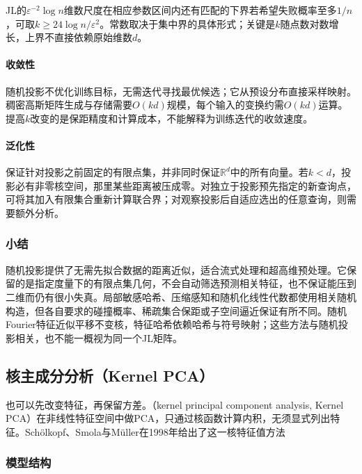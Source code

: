 JL的$\varepsilon^{-2}\log n$维数尺度在相应参数区间内还有匹配的下界若希望失败概率至多$1/n$，可取$k\geq24\log n/\varepsilon^2$。常数取决于集中界的具体形式；关键是$k$随点数对数增长，上界不直接依赖原始维数$d$。

\paragraph{收敛性}
随机投影不优化训练目标，无需迭代寻找最优候选；它从预设分布直接采样映射。稠密高斯矩阵生成与存储需要$O(kd)$规模，每个输入的变换约需$O(kd)$运算。提高$k$改变的是保距精度和计算成本，不能解释为训练迭代的收敛速度。

\paragraph{泛化性}

保证针对投影之前固定的有限点集，并非同时保证$\mathbb{R}^{d}$中的所有向量。若$k<d$，投影必有非零核空间，那里某些距离被压成零。对独立于投影预先指定的新查询点，可将其加入有限集合重新计算联合界；对观察投影后自适应选出的任意查询，则需要额外分析。

\subsubsection{小结}
\label{sec:dim-rp-summary}

随机投影提供了无需先拟合数据的距离近似，适合流式处理和超高维预处理。它保留的是指定度量下的有限点集几何，不会自动筛选预测相关特征，也不保证能压到二维而仍有很小失真。局部敏感哈希、压缩感知和随机化线性代数都使用相关随机构造，但各自要求的碰撞概率、稀疏集合保距或子空间逼近保证有所不同。随机Fourier特征近似平移不变核，特征哈希依赖哈希与符号映射；这些方法与随机投影相关，也不能一概视为同一个JL矩阵。

\subsection{核主成分分析（Kernel PCA）}
\label{sec:dim-kpca}

也可以先改变特征，再保留方差。（kernel principal component analysis, Kernel PCA）在非线性特征空间中做PCA，只通过核函数计算内积，无须显式列出特征。Schölkopf、Smola与Müller在1998年给出了这一核特征值方法

\subsubsection{模型结构}

